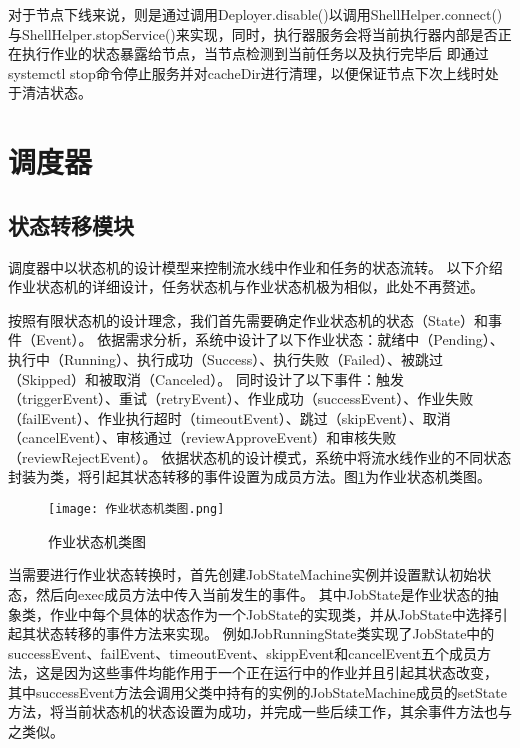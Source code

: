 对于节点下线来说，则是通过调用Deployer.disable()以调用ShellHelper.connect()与ShellHelper.stopService()来实现，同时，执行器服务会将当前执行器内部是否正在执行作业的状态暴露给节点，当节点检测到当前任务以及执行完毕后
即通过systemctl stop命令停止服务并对cacheDir进行清理，以便保证节点下次上线时处于清洁状态。


\section{调度器}

\subsection{状态转移模块}

调度器中以状态机的设计模型来控制流水线中作业和任务的状态流转。
以下介绍作业状态机的详细设计，任务状态机与作业状态机极为相似，此处不再赘述。

按照有限状态机的设计理念，我们首先需要确定作业状态机的状态（State）和事件（Event）。
依据需求分析，系统中设计了以下作业状态：就绪中（Pending）、执行中（Running）、执行成功（Success）、执行失败（Failed）、被跳过（Skipped）和被取消（Canceled）。
同时设计了以下事件：触发（triggerEvent）、重试（retryEvent）、作业成功（successEvent）、作业失败（failEvent）、作业执行超时（timeoutEvent）、跳过（skipEvent）、取消（cancelEvent）、审核通过（reviewApproveEvent）和审核失败（reviewRejectEvent）。
依据状态机的设计模式，系统中将流水线作业的不同状态封装为类，将引起其状态转移的事件设置为成员方法。图\ref{fig:作业状态机类图}为作业状态机类图。

\begin{figure}[h]
  \centering
  \texttt{[image: 作业状态机类图.png]}
  \caption{作业状态机类图}
  \label{fig:作业状态机类图}
\end{figure}

当需要进行作业状态转换时，首先创建JobStateMachine实例并设置默认初始状态，然后向exec成员方法中传入当前发生的事件。
其中JobState是作业状态的抽象类，作业中每个具体的状态作为一个JobState的实现类，并从JobState中选择引起其状态转移的事件方法来实现。
例如JobRunningState类实现了JobState中的successEvent、failEvent、timeoutEvent、skippEvent和cancelEvent五个成员方法，这是因为这些事件均能作用于一个正在运行中的作业并且引起其状态改变，
其中successEvent方法会调用父类中持有的实例的JobStateMachine成员的setState方法，将当前状态机的状态设置为成功，并完成一些后续工作，其余事件方法也与之类似。

